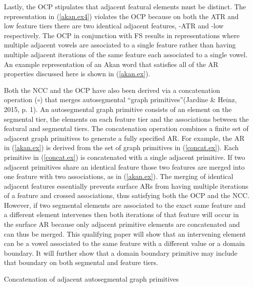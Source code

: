 \documentclass[,doc,floatsintext]{apa6}
\theoremstyle{definition}
\theoremstyle{definition}
\theoremstyle{definition}
\theoremstyle{remark}
\begin{document}
Lastly, the OCP stipulates that adjacent featural elements must be
distinct. The representation in (\ref{akan.ex4}) violates the OCP
because on both the ATR and low feature tiers there are two identical
adjacent features, -ATR and -low respectively. The OCP in conjunction
with FS results in representations where multiple adjacent vowels are
associated to a single feature rather than having multiple adjacent
iterations of the same feature each associated to a single vowel. An
example representation of an Akan word that satisfies all of the AR
properties discussed here is shown in (\ref{akan.ex}).

Both the NCC and the OCP have also been derived via a concatenation
operation (\(\circ\)) that merges autosegmental \enquote{graph
primitives}(Jardine \& Heinz, 2015, p. 1). An autosegmental graph
primitive consists of an element on the segmental tier, the elements on
each feature tier and the associations between the featural and
segmental tiers. The concatenation operation combines a finite set of
adjacent graph primitives to generate a fully specified AR. For example,
the AR in (\ref{akan.ex}) is derived from the set of graph primitives in
(\ref{concat.ex}). Each primitive in (\ref{concat.ex}) is concatenated
with a single adjacent primitive. If two adjacent primitives share an
identical feature those two features are merged into one feature with
two associations, as in (\ref{akan.ex}). The merging of identical
adjacent features essentially prevents surface ARs from having multiple
iterations of a feature and crossed associations, thus satisfying both
the OCP and the NCC. However, if two segmental elements are associated
to the exact same feature and a different element intervenes then both
iterations of that feature will occur in the surface AR because only
adjacent primitive elements are concatenated and can thus be merged.
This qualifying paper will show that an intervening element can be a
vowel associated to the same feature with a different value or a domain
boundary. It will further show that a domain boundary primitive may
include that boundary on both segmental and feature tiers.

\begin{exe}
\ex \label{concat.ex} Concatenation of adjacent autosegmental graph primitives \\
\end{exe}\newpage
\end{document}
